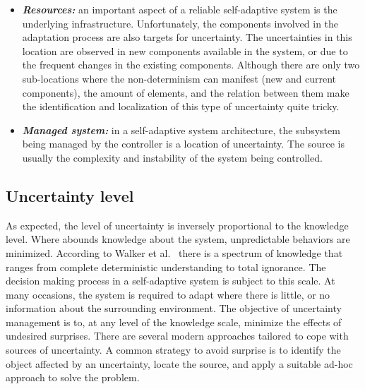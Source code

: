 \begin{itemize}
\item \textbf{\textit{Resources:}} an important aspect of a reliable self-adaptive system is the underlying infrastructure. Unfortunately, the components involved in the adaptation process are also targets for uncertainty. The uncertainties in this location are observed in new components available in the system, or due to the frequent changes in the existing components. Although there are only two sub-locations where the non-determinism can manifest (new and current components), the amount of elements, and the relation between them make the identification and localization of this type of uncertainty quite tricky.

\item \textbf{\textit{Managed system:}} in a self-adaptive system architecture, the subsystem being managed by the controller is a location of uncertainty. The source is usually the complexity and instability of the system being controlled.

\end{itemize}

\subsection{Uncertainty level}

As expected, the level of uncertainty is inversely proportional to the knowledge level. Where abounds knowledge about the system, unpredictable behaviors are minimized. According to Walker et al.~\cite{walker2003defining} there is a spectrum of knowledge that ranges from complete deterministic understanding to total ignorance. The decision making process in a self-adaptive system is subject to this scale. At many occasions, the system is required to adapt where there is little, or no information about the surrounding environment. The objective of uncertainty management is to, at any level of the knowledge scale, minimize the effects of undesired surprises. There are several modern approaches tailored to cope with sources of uncertainty. A common strategy to avoid surprise is to identify the object affected by an uncertainty, locate the source, and apply a suitable ad-hoc approach to solve the problem.

